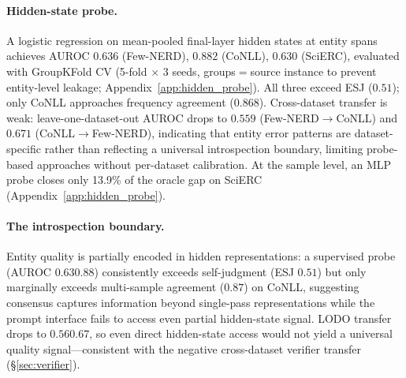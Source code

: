 \paragraph{Hidden-state probe.}
A logistic regression on mean-pooled final-layer hidden states at entity spans achieves AUROC $0.636$ (Few-NERD), $0.882$ (CoNLL), $0.630$ (SciERC), evaluated with GroupKFold CV (5-fold ${\times}$ 3 seeds, groups${=}$source instance to prevent entity-level leakage; Appendix~\ref{app:hidden_probe}).
All three exceed ESJ ($0.51$); only CoNLL approaches frequency agreement ($0.868$).
Cross-dataset transfer is weak: leave-one-dataset-out AUROC drops to $0.559$ (Few-NERD${\to}$CoNLL) and $0.671$ (CoNLL${\to}$Few-NERD), indicating that entity error patterns are dataset-specific rather than reflecting a universal introspection boundary, limiting probe-based approaches without per-dataset calibration.
At the sample level, an MLP probe closes only 13.9\% of the oracle gap on SciERC (Appendix~\ref{app:hidden_probe}).

\paragraph{The introspection boundary.}
Entity quality is partially encoded in hidden representations: a supervised probe (AUROC $0.63$\textendash$0.88$) consistently exceeds self-judgment (ESJ $0.51$) but only marginally exceeds multi-sample agreement ($0.87$) on CoNLL, suggesting consensus captures information beyond single-pass representations while the prompt interface fails to access even partial hidden-state signal.
LODO transfer drops to $0.56$\textendash$0.67$, so even direct hidden-state access would not yield a universal quality signal---consistent with the negative cross-dataset verifier transfer (\S\ref{sec:verifier}).

